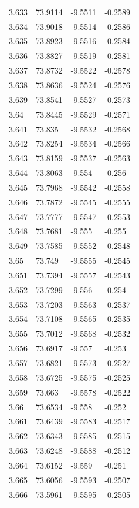 \begin{tabular}{llll}
3.633 & 73.9114 & -9.5511 & -0.2589 \\
3.634 & 73.9018 & -9.5514 & -0.2586 \\
3.635 & 73.8923 & -9.5516 & -0.2584 \\
3.636 & 73.8827 & -9.5519 & -0.2581 \\
3.637 & 73.8732 & -9.5522 & -0.2578 \\
3.638 & 73.8636 & -9.5524 & -0.2576 \\
3.639 & 73.8541 & -9.5527 & -0.2573 \\
3.64 & 73.8445 & -9.5529 & -0.2571 \\
3.641 & 73.835 & -9.5532 & -0.2568 \\
3.642 & 73.8254 & -9.5534 & -0.2566 \\
3.643 & 73.8159 & -9.5537 & -0.2563 \\
3.644 & 73.8063 & -9.554 & -0.256 \\
3.645 & 73.7968 & -9.5542 & -0.2558 \\
3.646 & 73.7872 & -9.5545 & -0.2555 \\
3.647 & 73.7777 & -9.5547 & -0.2553 \\
3.648 & 73.7681 & -9.555 & -0.255 \\
3.649 & 73.7585 & -9.5552 & -0.2548 \\
3.65 & 73.749 & -9.5555 & -0.2545 \\
3.651 & 73.7394 & -9.5557 & -0.2543 \\
3.652 & 73.7299 & -9.556 & -0.254 \\
3.653 & 73.7203 & -9.5563 & -0.2537 \\
3.654 & 73.7108 & -9.5565 & -0.2535 \\
3.655 & 73.7012 & -9.5568 & -0.2532 \\
3.656 & 73.6917 & -9.557 & -0.253 \\
3.657 & 73.6821 & -9.5573 & -0.2527 \\
3.658 & 73.6725 & -9.5575 & -0.2525 \\
3.659 & 73.663 & -9.5578 & -0.2522 \\
3.66 & 73.6534 & -9.558 & -0.252 \\
3.661 & 73.6439 & -9.5583 & -0.2517 \\
3.662 & 73.6343 & -9.5585 & -0.2515 \\
3.663 & 73.6248 & -9.5588 & -0.2512 \\
3.664 & 73.6152 & -9.559 & -0.251 \\
3.665 & 73.6056 & -9.5593 & -0.2507 \\
3.666 & 73.5961 & -9.5595 & -0.2505 \\

\end{tabular}
